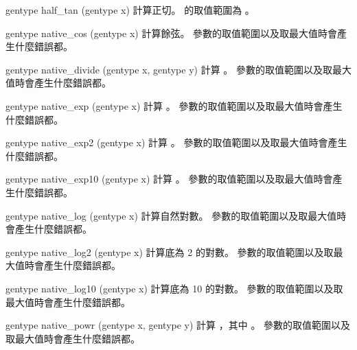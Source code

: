 gentype half_tan (gentype x)
\stopbuffer
{}
計算正切。  的取值範圍為 。
\stopbuffer

gentype native_cos (gentype x) 
\stopbuffer
{}
計算餘弦。
參數的取值範圍以及取最大值時會產生什麼錯誤都。
\stopbuffer

gentype native_divide (gentype x, 
		gentype y) 
\stopbuffer
{}
計算 。
參數的取值範圍以及取最大值時會產生什麼錯誤都。
\stopbuffer

gentype native_exp (gentype x) 
\stopbuffer
{}
計算 。
參數的取值範圍以及取最大值時會產生什麼錯誤都。
\stopbuffer

gentype native_exp2 (gentype x) 
\stopbuffer
{}
計算 。
參數的取值範圍以及取最大值時會產生什麼錯誤都。
\stopbuffer

gentype native_exp10 (gentype x) 
\stopbuffer
{}
計算 。
參數的取值範圍以及取最大值時會產生什麼錯誤都。
\stopbuffer

gentype native_log (gentype x) 
\stopbuffer
{}
計算自然對數。
參數的取值範圍以及取最大值時會產生什麼錯誤都。
\stopbuffer

gentype native_log2 (gentype x) 
\stopbuffer
{}
計算底為 2 的對數。
參數的取值範圍以及取最大值時會產生什麼錯誤都。
\stopbuffer

gentype native_log10 (gentype x) 
\stopbuffer
{}
計算底為 10 的對數。
參數的取值範圍以及取最大值時會產生什麼錯誤都。
\stopbuffer

gentype native_powr (gentype x,
		gentype y)
\stopbuffer
{}
計算 ，其中 。
參數的取值範圍以及取最大值時會產生什麼錯誤都。
\stopbuffer

